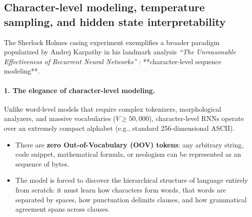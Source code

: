 \documentclass[../../main.tex]{subfiles}
\begin{document}
\subsection{Character-level modeling, temperature sampling, and hidden state interpretability}
\label{sec:karpathy_char_rnn}

The Sherlock Holmes casing experiment exemplifies a broader paradigm popularized by Andrej Karpathy in his landmark analysis \emph{``The Unreasonable Effectiveness of Recurrent Neural Networks''} \cite{karpathy2015rnn}: **character-level sequence modeling**.

\paragraph{1. The elegance of character-level modeling.}
Unlike word-level models that require complex tokenizers, morphological analyzers, and massive vocabularies ($V \ge 50{,}000$), character-level RNNs operate over an extremely compact alphabet (e.g., standard 256-dimensional ASCII). 
\begin{itemize}
    \item There are \textbf{zero Out-of-Vocabulary (OOV) tokens}: any arbitrary string, code snippet, mathematical formula, or neologism can be represented as an sequence of bytes.
    \item The model is forced to discover the hierarchical structure of language entirely from scratch: it must learn how characters form words, that words are separated by spaces, how punctuation delimits clauses, and how grammatical agreement spans across clauses.
\end{itemize}
\end{document}
